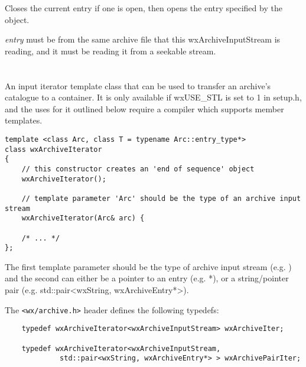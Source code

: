 \label{wxarchiveinputstreamopenentry}


Closes the current entry if one is open, then opens the entry specified
by the  object.

{\it entry} must be from the same archive file that this
wxArchiveInputStream is reading, and it must be reading it from a
seekable stream.




%
%

\section{}\label{wxarchiveiterator}

An input iterator template class that can be used to transfer an archive's
catalogue to a container. It is only available if wxUSE\_STL is set to 1
in setup.h, and the uses for it outlined below require a compiler which
supports member templates.

\begin{verbatim}
template <class Arc, class T = typename Arc::entry_type*>
class wxArchiveIterator
{
    // this constructor creates an 'end of sequence' object
    wxArchiveIterator();

    // template parameter 'Arc' should be the type of an archive input stream
    wxArchiveIterator(Arc& arc) {

    /* ... */
};

\end{verbatim}

The first template parameter should be the type of archive input stream
(e.g. ) and the
second can either be a pointer to an entry
(e.g. *), or a string/pointer pair
(e.g. std::pair<wxString, wxArchiveEntry*>).

The {\tt <wx/archive.h>} header defines the following typedefs:

\begin{verbatim}
    typedef wxArchiveIterator<wxArchiveInputStream> wxArchiveIter;

    typedef wxArchiveIterator<wxArchiveInputStream,
             std::pair<wxString, wxArchiveEntry*> > wxArchivePairIter;

\end{verbatim}

